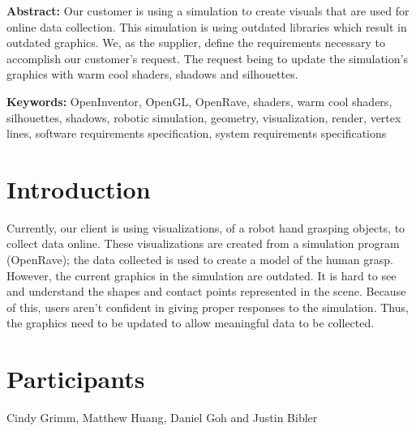 \documentclass[10pt,journal,compsoc]{IEEEtran}
\begin{document}
\begin{titlepage}
\begin{flushleft}
\vfill

\begin{normalsize}
{\bf Abstract:}
Our customer is using a simulation to create visuals that are used for online data collection.
This simulation is using outdated libraries which result in outdated graphics.
We, as the supplier, define the requirements necessary to accomplish our customer's request.
The request being to update the simulation's graphics with warm cool shaders, shadows and silhouettes.

{\bf Keywords:} OpenInventor, OpenGL, OpenRave, shaders, warm cool shaders, silhouettes, shadows, robotic simulation, geometry, visualization, render,
vertex lines, software requirements specification, system requirements specifications
\end{normalsize}
\end{flushleft}

\newpage

\end{titlepage}

\section*{Introduction}
\vspace{3mm}
Currently, our client is using visualizations, of a robot hand grasping objects, to collect data online.
These visualizations are created from a simulation program (OpenRave); the data collected is used to create a model of the human grasp.
However, the current graphics in the simulation are outdated.
It is hard to see and understand the shapes and contact points represented in the scene.
Because of this, users aren't confident in giving proper responses to the simulation.
Thus, the graphics need to be updated to allow meaningful data to be collected. \\


\section*{Participants}
\vspace{3mm}
Cindy Grimm, Matthew Huang, Daniel Goh and Justin Bibler \\ 

\newpage

\tableofcontents
\end{document}
